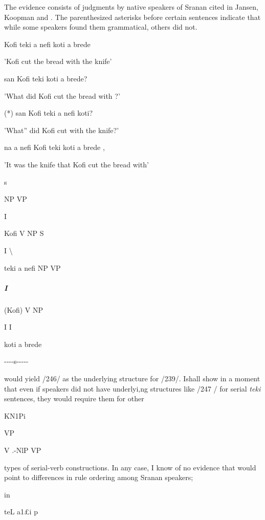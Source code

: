 The evidence consists of judgments by native speakers of Sranan cited in Jansen, Koopman and \citet{Muysken1978}. The parenthesized asterisks before certain sentences indicate that while some speakers found them grammatical, others did not.

\ea\label{ex:239}
 Kofi teki a nefi koti a brede
\glt
\z

'Kofi cut the bread with the knife'

\ea\label{ex:240}
 san Kofi teki koti a brede?
\glt
\z

'What did Kofi cut the bread with ?'

\ea\label{ex:241}
 (*) san Kofi teki a nefi koti?
\glt
\z

'What'' did Kofi cut with the knife?'

\ea\label{ex:242}
 na a nefi Kofi teki koti a brede ,
\glt
\z

'It was the knife that Kofi cut the bread with'

\ea\label{ex:246}

\glt
\z

s

NP VP

I

Kofi V NP S


I {\textbackslash}


teki a nefi NP VP

\subparagraph{I}

(Kofi) V NP

I I

koti a brede



\ea\label{ex:247}

\glt
\z

{}-{}-{}-{}-s{}-{}-{}-{}-{}- 

would yield /246/ as the underlying structure for /239/. Ishall show in a moment that even if speakers did not have underlyi,ng structures like /247 / for serial \textit{teki} sentences, they would require them for other

KN1Pi

VP

V .{}-NlP VP

types of serial-verb constructions. In any case, I know of no evidence that would point to differences in rule ordering among Sranan speakers;

in

teL a1£i p

